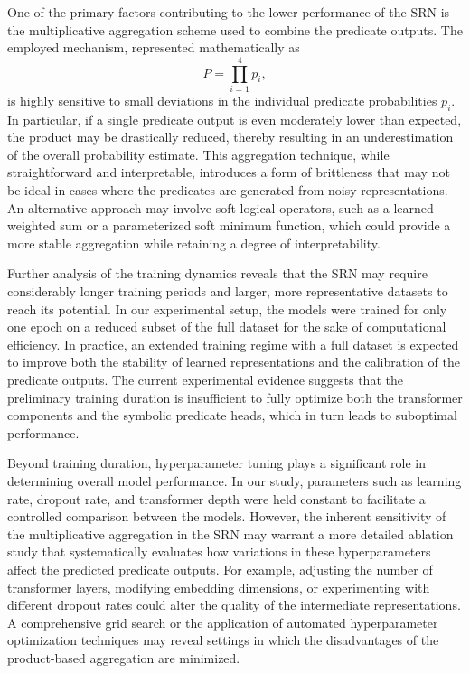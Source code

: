 \documentclass[11pt]{article}
\begin{document}
One of the primary factors contributing to the lower performance of the SRN is the multiplicative aggregation scheme used to combine the predicate outputs. The employed mechanism, represented mathematically as 
\[
P = \prod_{i=1}^{4} p_i,
\]
is highly sensitive to small deviations in the individual predicate probabilities \(p_i\). In particular, if a single predicate output is even moderately lower than expected, the product may be drastically reduced, thereby resulting in an underestimation of the overall probability estimate. This aggregation technique, while straightforward and interpretable, introduces a form of brittleness that may not be ideal in cases where the predicates are generated from noisy representations. An alternative approach may involve soft logical operators, such as a learned weighted sum or a parameterized soft minimum function, which could provide a more stable aggregation while retaining a degree of interpretability.

Further analysis of the training dynamics reveals that the SRN may require considerably longer training periods and larger, more representative datasets to reach its potential. In our experimental setup, the models were trained for only one epoch on a reduced subset of the full dataset for the sake of computational efficiency. In practice, an extended training regime with a full dataset is expected to improve both the stability of learned representations and the calibration of the predicate outputs. The current experimental evidence suggests that the preliminary training duration is insufficient to fully optimize both the transformer components and the symbolic predicate heads, which in turn leads to suboptimal performance.

Beyond training duration, hyperparameter tuning plays a significant role in determining overall model performance. In our study, parameters such as learning rate, dropout rate, and transformer depth were held constant to facilitate a controlled comparison between the models. However, the inherent sensitivity of the multiplicative aggregation in the SRN may warrant a more detailed ablation study that systematically evaluates how variations in these hyperparameters affect the predicted predicate outputs. For example, adjusting the number of transformer layers, modifying embedding dimensions, or experimenting with different dropout rates could alter the quality of the intermediate representations. A comprehensive grid search or the application of automated hyperparameter optimization techniques may reveal settings in which the disadvantages of the product-based aggregation are minimized.
\end{document}
